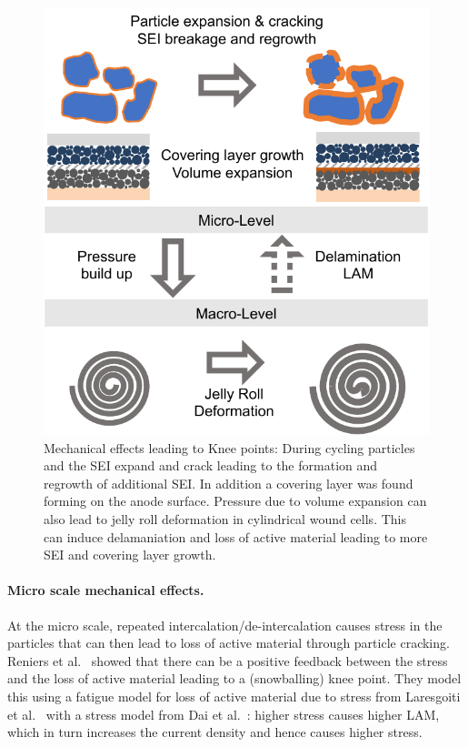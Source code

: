 \documentclass[journal=jpcl, manuscript=article, layout=onecolumn]{achemso}
\begin{document}
\begin{figure}[ht]
\centering
\includegraphics[scale = 1]{figures/MechanicalKneepoints.pdf}
\caption{Mechanical effects leading to Knee points: During cycling particles and the SEI expand and crack leading to the formation and regrowth of additional SEI. In addition a covering layer was found forming on the anode surface. Pressure due to volume expansion can also lead to jelly roll deformation in cylindrical wound cells. This can induce delamaniation and loss of active material leading to more SEI and covering layer growth.}
\label{fig:knee_mechanical}
\end{figure}

\paragraph{Micro scale mechanical effects.}

At the micro scale, repeated intercalation/de-intercalation causes stress in the particles that can then lead to loss of active material through particle cracking.
Reniers et al.~\cite{reniers_review_2019} showed that there can be a positive feedback between the stress and the loss of active material leading to a (snowballing) knee point. They model this using a fatigue model for loss of active material due to stress from Laresgoiti et al.~\cite{laresgoiti_modeling_2015} with a stress model from Dai et al.~\cite{dai_simulation_2014}: higher stress causes higher LAM, which in turn increases the current density and hence causes higher stress.
\end{document}
